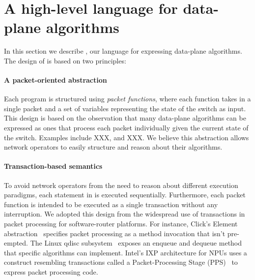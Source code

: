\section{A high-level language for data-plane algorithms}
\label{s:language}

In this section we describe \pktlanguage, our language for expressing 
data-plane algorithms. The design of \pktlanguage is based on two principles:

\paragraph{A packet-oriented abstraction} 
Each \pktlanguage program is structured using
{\em packet functions}, where each function takes in a single packet
and a set of variables representing the state of the switch as input.
This design is based on the observation that many data-plane algorithms can
be expressed as ones that process each packet individually given the current 
state of the switch. Examples include XXX, and XXX.
We believe this abstraction allows network operators to easily structure
and reason about their algorithms.

\paragraph{Transaction-based semantics} 
To avoid network operators from the need to reason about different execution
paradigms, each statement in \pktlanguage is executed sequentially.
Furthermore, each \pktlanguage packet function is intended to be executed
as a single transaction without any interruption. We adopted this design
from the widespread use of transactions 
in packet processing for software-router platforms. For instance,
Click's Element abstraction~\cite{click} specifies packet processing as
a method invocation that isn't pre-empted.  The Linux qdisc
subsystem~\cite{qdisc} exposes an enqueue and dequeue method that specific
algorithms can implement. Intel's IXP architecture for NPUs uses a construct
resembling transactions called a Packet-Processing Stage
(PPS)~\cite{npu} to express packet processing code.

